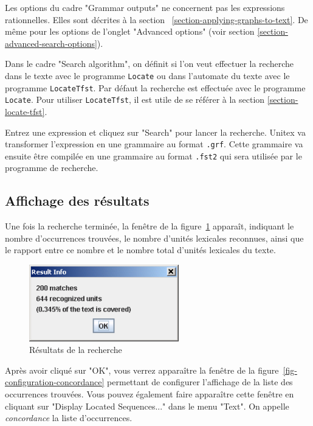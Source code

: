 \bigskip
\noindent Les options du cadre "Grammar outputs" ne concernent pas les expressions rationnelles.
Elles sont décrites à la section
~\ref{section-applying-graphs-to-text}. De même pour les options de l'onglet
"Advanced options" (voir section \ref{section-advanced-search-options}).

\bigskip
\noindent Dans le cadre "Search algorithm", on définit si l'on veut effectuer la recherche dans le
texte avec le programme \verb+Locate+ ou dans l'automate du texte avec le programme \verb+LocateTfst+.
Par défaut la recherche est effectuée avec le programme \verb+Locate+. Pour utiliser
\verb+LocateTfst+, il est utile de se référer à la section \ref{section-locate-tfst}.

\bigskip
\noindent Entrez une expression et cliquez sur "Search" pour lancer la recherche. Unitex va transformer
l’expression en une grammaire au format \verb+.grf+.
 Cette grammaire va ensuite être compilée en une grammaire au format
\verb+.fst2+ qui sera utilisée par le programme de recherche.


\subsection{Affichage des résultats}
\label{section-display-occurrences}
Une fois la recherche terminée, la fenêtre de la figure~\ref{fig-search-results}
apparaît, indiquant le nombre d’occurrences trouvées, le nombre d’unités lexicales reconnues,
ainsi que le rapport entre ce nombre et le nombre total d’unités lexicales du texte.

\bigskip
\begin{figure}[h]
\begin{center}
\includegraphics[width=6.5cm]{resources/img/fig4-5.png}
\caption{Résultats de la recherche \label{fig-search-results}}
\end{center}
\end{figure}

\noindent Après avoir cliqué sur "OK", vous verrez apparaître la fenêtre de la
figure~\ref{fig-configuration-concordance} permettant de configurer l’affichage de la liste
des occurrences trouvées. Vous pouvez également faire apparaître cette fenêtre en cliquant sur
"Display Located Sequences..." dans le menu "Text".
On appelle \textit{concordance} la liste d’occurrences.



